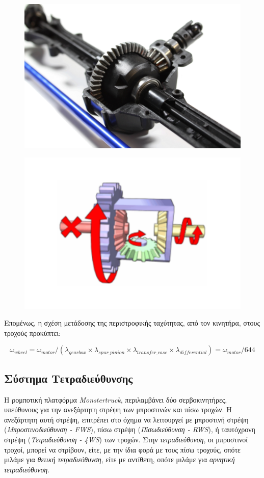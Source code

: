 \begin{figure}[!ht]
	\begin{minipage}{.49\textwidth}
		\centering
		\includegraphics[width=0.5\linewidth]{Chapters/Chapter2/Figures/differential.png}
		\label{fig:differential}
	\end{minipage}
	\begin{minipage}{.5\textwidth}
	 	\centering		
		\includegraphics[width=0.5\linewidth]		
			{Chapters/Chapter2/Figures/differential_function.png}
		\label{fig:differential_function}
	\end{minipage}
\end{figure}

\bigskip
Επομένως, η σχέση μετάδοσης της περιστροφικής ταχύτητας, από τον κινητήρα, στους τροχούς προκύπτει:

\begin{equation}
	\omega_{wheel} = \omega_{motor} / (\lambda_{gearbox} \times \lambda_{spur\_pinion} \times \lambda_{transfer\_case} \times \lambda_{differential}) = \omega_{motor} / 644
\end{equation}

\bigskip
\subsection{Σύστημα Τετραδιεύθυνσης} \label{ssec:four_wheel_steering}
Η ρομποτική πλατφόρμα \textit{Monstertruck}, περιλαμβάνει δύο σερβοκινητήρες, υπεύθυνους για την ανεξάρτητη στρέψη των μπροστινών και πίσω τροχών. Η ανεξάρτητη αυτή στρέψη, επιτρέπει στο όχημα να λειτουργεί με μπροστινή στρέψη (\textit{Μπροστινοδιεύθυνση - FWS}), πίσω στρέψη (\textit{Πίσωδιεύθυνση - RWS}), ή ταυτόχρονη στρέψη (\textit{Τετραδιεύθυνση - 4WS}) των τροχών. Στην \textit{τετραδιεύθυνση}, οι μπροστινοί τροχοί, μπορεί να στρίβουν, είτε, με την ίδια φορά με τους πίσω τροχούς, οπότε μιλάμε για \textit{θετική τετραδιεύθυνση}, είτε με αντίθετη, οπότε μιλάμε για \textit{αρνητική τετραδιεύθυνση}.

